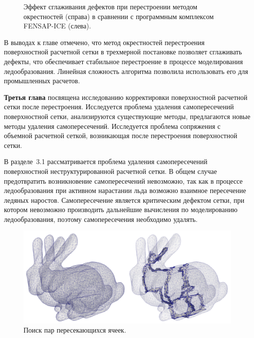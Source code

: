 \documentclass[a4paper,14pt]{extarticle}                     %
\theoremstyle{plain}                                         %
\begin{document}
\begin{figure}[!ht]
\begin{tabular}{ll}
\end{tabular}
\singlespacing
\caption{Эффект сглаживания дефектов при перестроении методом окрестностей (справа) в сравнении с программным комплексом FENSAP-ICE (слева).}
\label{fig:text_1_remesh3_with_fensap}
\end{figure}

В выводах к главе отмечено, что метод окрестностей перестроения поверхностной расчетной сетки в трехмерной постановке позволяет сглаживать дефекты, что обеспечивает стабильное перестроение в процессе моделирования ледообразования.
Линейная сложность алгоритма позволила использовать его для промышленных расчетов.


\textbf{Третья глава} посвящена исследованию корректировки поверхностной расчетной сетки после перестроения.
Исследуется проблема удаления самопересечений поверхностной сетки, анализируются существующие методы, предлагаются новые методы удаления самопересечений.
Исследуется проблема сопряжения с объемной расчетной сеткой, возникающая после перестроения поверхностной сетки.

В разделе~3.1 рассматривается проблема удаления самопересечений поверхностной неструктурированной расчетной сетки.
В общем случае предотвратить возникновение самопересечений невозможно, так как в процессе ледообразования при активном нарастании льда возможно взаимное пересечение ледяных наростов.
Самопересечение является критическим дефектом сетки, при котором невозможно производить дальнейшие вычисления по моделированию ледообразования, поэтому самопересечения необходимо удалять.

\begin{figure}[!ht]
\centering
\includegraphics[width=1.0\textwidth]{fig/int_bunnies_dbl.png}
\singlespacing
\caption{Поиск пар пересекающихся ячеек.}
\label{fig:text_1_int_1}
\end{figure}
\end{document}
